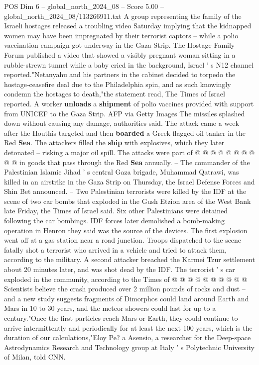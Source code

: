 \begin{textsample}{POS Dim 6 – global\_north\_2024\_08 – Score 5.00 – global\_north\_2024\_08/113266911.txt}  \label{ex:f6_pos_379}
A group representing the family of the Israeli hostages released a troubling video Saturday implying that the kidnapped women may have been impregnated by their terrorist captors -- while a polio vaccination campaign got underway in the Gaza Strip.
The Hostage Family Forum published a video that showed a visibly pregnant woman sitting in a rubble-strewn tunnel while a baby cried in the background, Israel ' s N12 channel reported."Netanyahu and his partners in the cabinet decided to torpedo the hostage-ceasefire deal due to the Philadelphia spin, and as such knowingly condemn the hostages to death,"the statement read, The Times of Israel reported.
A worker \textbf{unloads} a \textbf{shipment} of polio vaccines provided with support from UNICEF to the Gaza Strip.
AFP via Getty Images The missiles splashed down without causing any damage, authorities said.
The attack came a week after the Houthis targeted and then \textbf{boarded} a Greek-flagged oil tanker in the Red \textbf{Sea}.
The attackers filled the \textbf{ship} with explosives, which they later detonated -- risking a major oil spill.
The attacks were part of @ @ @ @ @ @ @ @ @ @ in goods that pass through the Red \textbf{Sea} annually. -- The commander of the Palestinian Islamic Jihad ' s central Gaza brigade, Muhammad Qatrawi, was killed in an airstrike in the Gaza Strip on Thursday, the Israel Defense Forces and Shin Bet announced. -- Two Palestinian terrorists were killed by the IDF at the scene of two car bombs that exploded in the Gush Etzion area of the West Bank late Friday, the Times of Israel said.
Six other Palestinians were detained following the car bombings.
IDF forces later demolished a bomb-making operation in Henron they said was the source of the devices.
The first explosion went off at a gas station near a road junction.
Troops dispatched to the scene fatally shot a terrorist who arrived in a vehicle and tried to attack them, according to the military.
A second attacker breached the Karmei Tzur settlement about 20 minutes later, and was shot dead by the IDF.
The terrorist ' s car exploded in the community, according to the Times of @ @ @ @ @ @ @ @ @ @ Scientists believe the crash produced over 2 million pounds of rocks and dust -- and a new study suggests fragments of Dimorphos could land around Earth and Mars in 10 to 30 years, and the meteor showers could last for up to a century."Once the first particles reach Mars or Earth, they could continue to arrive intermittently and periodically for at least the next 100 years, which is the duration of our calculations,"Eloy Pe? a Asensio, a researcher for the Deep-space Astrodynamics Research and Technology group at Italy ' s Polytechnic University of Milan, told CNN.

\end{textsample}
